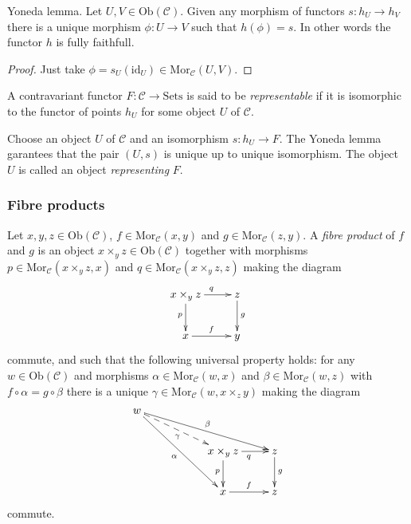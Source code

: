 \begin{lemma}
\label{lemma-yoneda}
Yoneda lemma.
Let $U,V \in \text{Ob}(\mathcal{C})$.
Given any morphism of functors $s : h_U \to h_V$
there is a unique morphism $\phi : U \to V$
such that $h(\phi) = s$. In other words the
functor $h$ is fully faithfull.
\end{lemma}

\begin{proof}
Just take $\phi = s_U(\text{id}_U) \in \text{Mor}_{\mathcal{C}}(U,V)$.
\end{proof}

\begin{definition}
\label{definition-representable-functor}
A contravariant functor $F : \mathcal{C}\to \text{Sets}$ is said
to be {\it representable} if it is isomorphic to the functor of
points $h_U$ for some object $U$ of $\mathcal{C}$.
\end{definition}

\noindent
Choose an object $U$ of $\mathcal{C}$ and an isomorphism $s : h_U \to F$.
The Yoneda lemma garantees that the pair $(U, s)$ 
is unique up to unique isomorphism. The object
$U$ is called an object {\it representing} $F$.

\subsubsection{Fibre products}
\label{subsubsection-fibre-products}

\begin{definition}
\label{definition-fibre-products}
Let $x,y,z\in \text{Ob}(\mathcal{C})$,
$f\in \text{Mor}_{\mathcal{C}}(x,y)$
and $g\in \text{Mor}_{\mathcal C}(z,y)$.
A {\it fibre product} of $f$ and $g$ is
an object $x\times_y z\in \text{Ob}(\mathcal{C})$
together with morphisms 
$p\in \text{Mor}_{\mathcal C}(x\times_y z,x)$ and 
$q\in\text{Mor}_{\mathcal C}(x\times_y z,z)$ making the diagram
$$
\xymatrix{
x\times_y z \ar[r]^{q} \ar[d]_{p}
&
z \ar[d]^{g}
\\
x \ar[r]^{f}
&
y
}
$$
commute, and such that the following universal property holds: for
any $w\in \text{Ob}(\mathcal{C})$ and morphisms 
$\alpha \in \text{Mor}_{\mathcal C}(w,x)$ and 
$\beta \in \text{Mor}_{\mathcal{C}}(w,z)$ with
$f \circ \alpha= g\circ \beta$
there is a unique
$\gamma\in \text{Mor}_{\mathcal C}(w,x\times_z y)$ making
the diagram
$$
\xymatrix{
w \ar[rrrd]^\beta \ar@{-->}[rrd]_\gamma \ar[rrdd]_\alpha
&
&
\\
&
&
x\times_y z \ar[d]_{p} \ar[r]_{q}
&
z \ar[d]^{g}
\\
&
&
x \ar[r]^{f}
&
z
}
$$
commute.
\end{definition}

